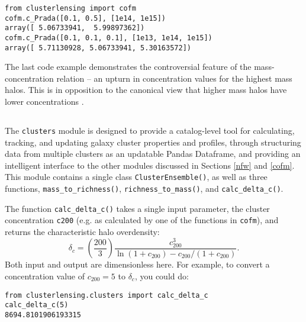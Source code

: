 \documentclass[twocolumn]{aastex6}
\newcommand{\code}{\lstinline[style=codeintext]}
\newcommand{\hcode}{\large\normalfont\texttt} %
\begin{document}
\begin{lstlisting}
from clusterlensing import cofm
cofm.c_Prada([0.1, 0.5], [1e14, 1e15])
array([ 5.06733941,  5.99897362])
cofm.c_Prada([0.1, 0.1, 0.1], [1e13, 1e14, 1e15])
array([ 5.71130928, 5.06733941, 5.30163572])
\end{lstlisting}
The last code example demonstrates the controversial feature of the \citet{Prada12} mass-concentration relation -- an upturn in concentration values for the highest mass halos. This is in opposition to the canonical view that higher mass halos have lower concentrations \citep{nfw96, nfw97, Jing00, Bullock01}.


\subsection{\normalfont{\hcode{clusters}}}
\label{clusters}
The \code{clusters} module is designed to provide a catalog-level tool for calculating, tracking, and updating galaxy cluster properties and profiles, through structuring data from multiple clusters as an updatable Pandas Dataframe, and providing an intelligent interface to the other modules discussed in Sections \ref{nfw} and \ref{cofm}. This module contains a single class \code{ClusterEnsemble()}, as well as three functions, \code{mass_to_richness()}, \code{richness_to_mass()}, and \code{calc_delta_c()}.

The function \code{calc_delta_c()} takes a single input parameter, the cluster concentration \code{c200} (e.g. as calculated by one of the functions in \code{cofm}), and returns the characteristic halo overdensity:
\begin{equation}
\delta_c = \left( \frac{200}{3} \right) \frac{c_{200}^3}{\ln(1 + c_{200}) - c_{200}/(1 + c_{200})}.
\end{equation}
Both input and output are dimensionless here. For example, to convert a concentration value of $c_{200} = 5$ to $\delta_c$, you could do:
\begin{lstlisting}
from clusterlensing.clusters import calc_delta_c
calc_delta_c(5)
8694.8101906193315
\end{lstlisting}
\end{document}

